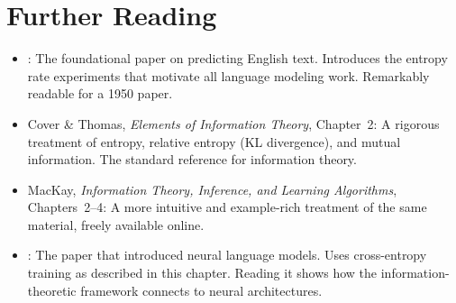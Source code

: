 \section{Further Reading}
\label{ch:01:sec:further}

\begin{itemize}
  \item \textcite{shannon1950}: The foundational paper on predicting English text. Introduces the entropy rate experiments that motivate all language modeling work. Remarkably readable for a 1950 paper.

  \item Cover \& Thomas, \textit{Elements of Information Theory}, Chapter~2: A rigorous treatment of entropy, relative entropy (KL divergence), and mutual information. The standard reference for information theory.

  \item MacKay, \textit{Information Theory, Inference, and Learning Algorithms}, Chapters~2--4: A more intuitive and example-rich treatment of the same material, freely available online.

  \item \textcite{bengio2003}: The paper that introduced neural language models. Uses cross-entropy training as described in this chapter. Reading it shows how the information-theoretic framework connects to neural architectures.
\end{itemize}
